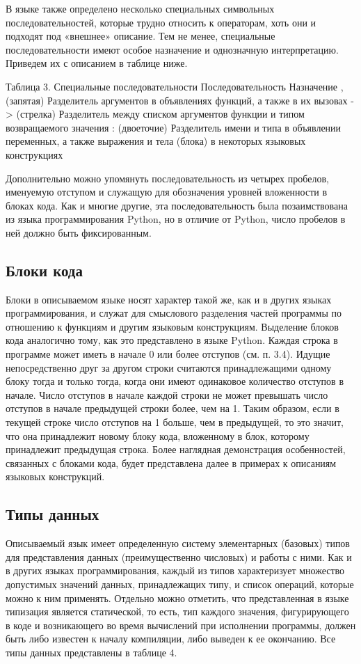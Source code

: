 В языке также определено несколько специальных символьных последовательностей, которые трудно относить к операторам, хоть они и подходят под «внешнее» описание. Тем не менее, специальные последовательности имеют особое назначение и однозначную интерпретацию. Приведем их с описанием в таблице ниже.

Таблица 3. Специальные последовательности
Последовательность	Назначение
, (запятая)	Разделитель аргументов в объявлениях функций, а также в их вызовах
-> (стрелка)	Разделитель между списком аргументов функции и типом возвращаемого значения
: (двоеточие)	Разделитель имени и типа в объявлении переменных, а также выражения и тела (блока) в некоторых языковых конструкциях

Дополнительно можно упомянуть последовательность из четырех пробелов, именуемую отступом и служащую для обозначения уровней вложенности в блоках кода. Как и многие другие, эта последовательность была позаимствована из языка программирования Python, но в отличие от Python, число пробелов в ней должно быть фиксированным.

\subsection{Блоки кода}

Блоки в описываемом языке носят характер такой же, как и в других языках программирования, и служат для смыслового разделения частей программы по отношению к функциям и другим языковым конструкциям. Выделение блоков кода аналогично тому, как это представлено в языке Python. Каждая строка в программе может иметь в начале 0 или более отступов (см. п. 3.4). Идущие непосредственно друг за другом строки считаются принадлежащими одному блоку тогда и только тогда, когда они имеют одинаковое количество отступов в начале. Число отступов в начале каждой строки не может превышать число отступов в начале предыдущей строки более, чем на 1. Таким образом, если в текущей строке число отступов на 1 больше, чем в предыдущей, то это значит, что она принадлежит новому блоку кода, вложенному в блок, которому принадлежит предыдущая строка. Более наглядная демонстрация особенностей, связанных с блоками кода, будет представлена далее в примерах к описаниям языковых конструкций.

\subsection{Типы данных}

Описываемый язык имеет определенную систему элементарных (базовых) типов для представления данных (преимущественно числовых) и работы с ними. Как и в других языках программирования, каждый из типов характеризует множество допустимых значений данных, принадлежащих типу, и список операций, которые можно к ним применять. Отдельно можно отметить, что представленная в языке типизация является статической, то есть, тип каждого значения, фигурирующего в коде и возникающего во время вычислений при исполнении программы, должен быть либо известен к началу компиляции, либо выведен к ее окончанию. Все типы данных представлены в таблице 4.

